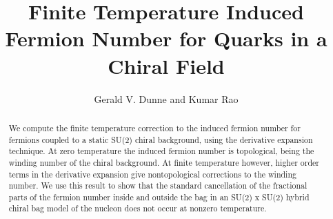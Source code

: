 \documentclass[a4paper,prd,showpacs,showkeys]{revtex4}
\begin{document}
\title{Finite Temperature Induced Fermion Number for Quarks in a Chiral Field}

\author{Gerald V. Dunne and Kumar Rao}


\begin{abstract}

We compute the finite temperature correction to the induced fermion number for fermions coupled to a static SU(2) chiral background, using the derivative expansion technique. At zero temperature the induced fermion number is topological, being the winding number of the chiral background. At finite temperature however, higher order terms in the derivative expansion give nontopological corrections to the winding number. We use this result to show that the standard cancellation of the fractional parts of the fermion number inside and outside the bag in an SU(2) x SU(2) hybrid chiral bag model of the nucleon does not occur at nonzero temperature.

\end{abstract}

\maketitle
\end{document}
